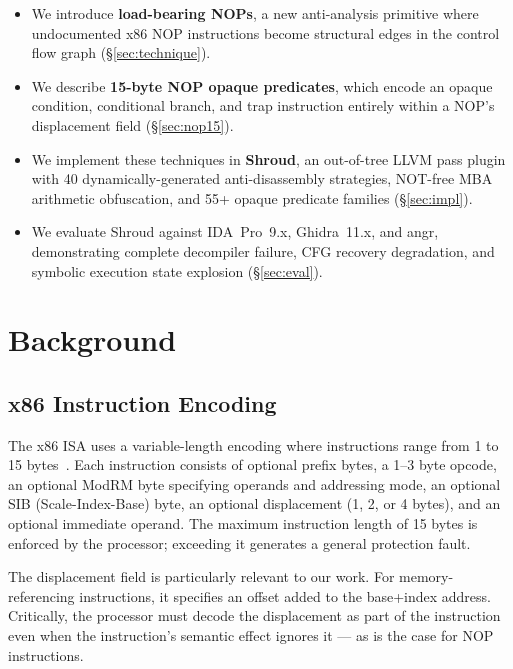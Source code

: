 \documentclass[letterpaper,twocolumn,10pt]{article}
\begin{document}
\begin{itemize}
\item We introduce \textbf{load-bearing NOPs}, a new anti-analysis primitive where undocumented x86 NOP instructions become structural edges in the control flow graph (\S\ref{sec:technique}).
\item We describe \textbf{15-byte NOP opaque predicates}, which encode an opaque condition, conditional branch, and trap instruction entirely within a NOP's displacement field (\S\ref{sec:nop15}).
\item We implement these techniques in \textbf{Shroud}, an out-of-tree LLVM pass plugin with 40 dynamically-generated anti-disassembly strategies, NOT-free MBA arithmetic obfuscation, and 55+ opaque predicate families (\S\ref{sec:impl}).
\item We evaluate Shroud against IDA~Pro~9.x, Ghidra~11.x, and angr, demonstrating complete decompiler failure, CFG recovery degradation, and symbolic execution state explosion (\S\ref{sec:eval}).
\end{itemize}

\section{Background}
\label{sec:background}

\subsection{x86 Instruction Encoding}

The x86 ISA uses a variable-length encoding where instructions range from 1 to 15 bytes~\cite{intelsdm}. Each instruction consists of optional prefix bytes, a 1--3 byte opcode, an optional ModRM byte specifying operands and addressing mode, an optional SIB (Scale-Index-Base) byte, an optional displacement (1, 2, or 4 bytes), and an optional immediate operand. The maximum instruction length of 15 bytes is enforced by the processor; exceeding it generates a general protection fault.

The displacement field is particularly relevant to our work. For memory-referencing instructions, it specifies an offset added to the base+index address. Critically, the processor must decode the displacement as part of the instruction even when the instruction's semantic effect ignores it --- as is the case for NOP instructions.
\end{document}
